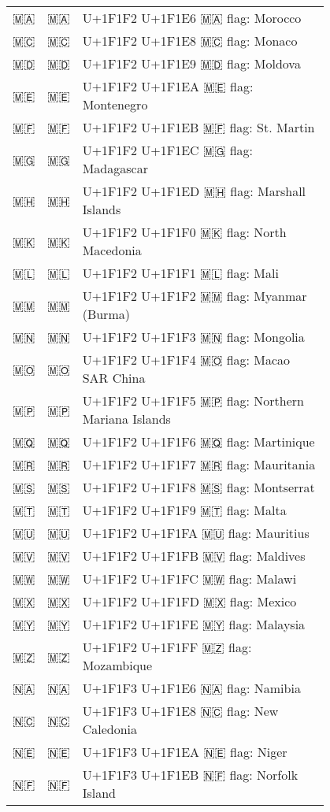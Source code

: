 \documentclass[a4paper,12pt]{article}
\newcommand{\fontA}[1]{{\fontspec[RawFeature={mode=harf,+dist,+ccmp}]{Segoe UI Emoji} #1}}
\newcommand{\fontB}[1]{{\fontspec[RawFeature={mode=harf,+dist,+ccmp}]{Noto Color Emoji} #1}}
\begin{document}
\begin{longtable}[c]{ccp{0.8\linewidth}}
\fontA{🇲🇦}&\fontB{🇲🇦}&U+1F1F2 U+1F1E6 🇲🇦 flag: Morocco\\
\fontA{🇲🇨}&\fontB{🇲🇨}&U+1F1F2 U+1F1E8 🇲🇨 flag: Monaco\\
\fontA{🇲🇩}&\fontB{🇲🇩}&U+1F1F2 U+1F1E9 🇲🇩 flag: Moldova\\
\fontA{🇲🇪}&\fontB{🇲🇪}&U+1F1F2 U+1F1EA 🇲🇪 flag: Montenegro\\
\fontA{🇲🇫}&\fontB{🇲🇫}&U+1F1F2 U+1F1EB 🇲🇫 flag: St. Martin\\
\fontA{🇲🇬}&\fontB{🇲🇬}&U+1F1F2 U+1F1EC 🇲🇬 flag: Madagascar\\
\fontA{🇲🇭}&\fontB{🇲🇭}&U+1F1F2 U+1F1ED 🇲🇭 flag: Marshall Islands\\
\fontA{🇲🇰}&\fontB{🇲🇰}&U+1F1F2 U+1F1F0 🇲🇰 flag: North Macedonia\\
\fontA{🇲🇱}&\fontB{🇲🇱}&U+1F1F2 U+1F1F1 🇲🇱 flag: Mali\\
\fontA{🇲🇲}&\fontB{🇲🇲}&U+1F1F2 U+1F1F2 🇲🇲 flag: Myanmar (Burma)\\
\fontA{🇲🇳}&\fontB{🇲🇳}&U+1F1F2 U+1F1F3 🇲🇳 flag: Mongolia\\
\fontA{🇲🇴}&\fontB{🇲🇴}&U+1F1F2 U+1F1F4 🇲🇴 flag: Macao SAR China\\
\fontA{🇲🇵}&\fontB{🇲🇵}&U+1F1F2 U+1F1F5 🇲🇵 flag: Northern Mariana Islands\\
\fontA{🇲🇶}&\fontB{🇲🇶}&U+1F1F2 U+1F1F6 🇲🇶 flag: Martinique\\
\fontA{🇲🇷}&\fontB{🇲🇷}&U+1F1F2 U+1F1F7 🇲🇷 flag: Mauritania\\
\fontA{🇲🇸}&\fontB{🇲🇸}&U+1F1F2 U+1F1F8 🇲🇸 flag: Montserrat\\
\fontA{🇲🇹}&\fontB{🇲🇹}&U+1F1F2 U+1F1F9 🇲🇹 flag: Malta\\
\fontA{🇲🇺}&\fontB{🇲🇺}&U+1F1F2 U+1F1FA 🇲🇺 flag: Mauritius\\
\fontA{🇲🇻}&\fontB{🇲🇻}&U+1F1F2 U+1F1FB 🇲🇻 flag: Maldives\\
\fontA{🇲🇼}&\fontB{🇲🇼}&U+1F1F2 U+1F1FC 🇲🇼 flag: Malawi\\
\fontA{🇲🇽}&\fontB{🇲🇽}&U+1F1F2 U+1F1FD 🇲🇽 flag: Mexico\\
\fontA{🇲🇾}&\fontB{🇲🇾}&U+1F1F2 U+1F1FE 🇲🇾 flag: Malaysia\\
\fontA{🇲🇿}&\fontB{🇲🇿}&U+1F1F2 U+1F1FF 🇲🇿 flag: Mozambique\\
\fontA{🇳🇦}&\fontB{🇳🇦}&U+1F1F3 U+1F1E6 🇳🇦 flag: Namibia\\
\fontA{🇳🇨}&\fontB{🇳🇨}&U+1F1F3 U+1F1E8 🇳🇨 flag: New Caledonia\\
\fontA{🇳🇪}&\fontB{🇳🇪}&U+1F1F3 U+1F1EA 🇳🇪 flag: Niger\\
\fontA{🇳🇫}&\fontB{🇳🇫}&U+1F1F3 U+1F1EB 🇳🇫 flag: Norfolk Island\\

\end{longtable}
\end{document}
